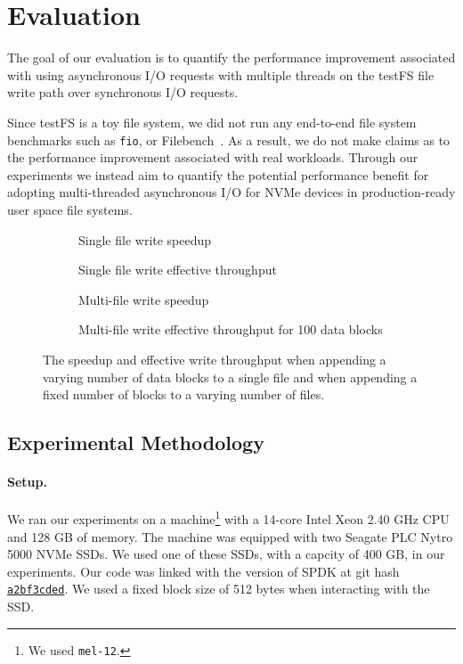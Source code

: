 \section{Evaluation}
The goal of our evaluation is to quantify the performance improvement
associated with using asynchronous I/O requests with multiple threads on the
testFS file write path over synchronous I/O requests.

Since testFS is a toy file system, we did not run any end-to-end file system
benchmarks such as {\tt fio}, or Filebench~\cite{filebench-tarasov16}. As a
result, we do not make claims as to the performance improvement associated with
real workloads. Through our experiments we instead aim to quantify the
potential performance benefit for adopting multi-threaded asynchronous I/O for
NVMe devices in production-ready user space file systems.

\begin{figure*}
\centering
\begin{subfigure}[t]{0.49\linewidth}
  
  \caption{Single file write speedup}\label{fig:single-file-speedup}
\end{subfigure}\hfill%
\begin{subfigure}[t]{0.49\linewidth}
  
  \caption{Single file write effective throughput}\label{fig:single-file-thpt}
\end{subfigure}
\par\bigskip
\begin{subfigure}[t]{0.49\linewidth}
  
  \caption{Multi-file write speedup}\label{fig:multi-file-speedup}
\end{subfigure}%
\begin{subfigure}[t]{0.49\linewidth}
  
  \caption{Multi-file write effective throughput for 100 data blocks}
  \label{fig:multi-file-thpt}
\end{subfigure}
\caption{The speedup and effective write throughput when appending a varying
number of data blocks to a single file and when appending a fixed number of
blocks to a varying number of files.}
\end{figure*}

\subsection{Experimental Methodology}
\paragraph{Setup.}
We ran our experiments on a machine\footnote{We used {\tt mel-12}.} with a
14-core Intel Xeon 2.40 GHz CPU and 128 GB of memory. The machine was equipped
with two Seagate PLC Nytro 5000 NVMe SSDs. We used one of these SSDs, with a
capcity of 400 GB, in our experiments. Our code was linked with the version of
SPDK at git hash
\href{https://github.com/spdk/spdk/commit/a2bf3cded37b7cc7e402eae80da90891f921b56d}{\tt a2bf3cded}.
We used a fixed block size of 512 bytes when interacting with the SSD.

